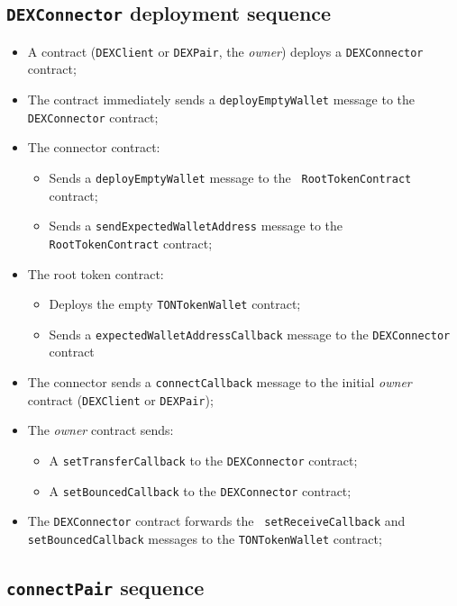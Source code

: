 \subsection{{\tt DEXConnector} deployment sequence}

\begin{itemize}
\item A contract ({\tt DEXClient} or {\tt DEXPair}, the {\em
  owner}) deploys a {\tt DEXConnector} contract;
\item The contract immediately sends a {\tt deployEmptyWallet} message
  to the {\tt DEXConnector} contract;
\item The connector contract:
  \begin{itemize}
  \item Sends a {\tt deployEmptyWallet} message to the {\tt
    RootTokenContract} contract;
  \item Sends a {\tt sendExpectedWalletAddress} message to the {\tt
    RootTokenContract} contract;
  \end{itemize}
\item The root token contract:
  \begin{itemize}
  \item Deploys the empty {\tt TONTokenWallet} contract;
  \item Sends a {\tt expectedWalletAddressCallback} message to the
    {\tt DEXConnector} contract
  \end{itemize}
\item The connector sends a {\tt connectCallback} message to the
  initial {\em owner} contract ({\tt DEXClient} or {\tt DEXPair});
\item The {\em owner} contract sends:
  \begin{itemize}
  \item A {\tt setTransferCallback} to the {\tt DEXConnector} contract;
  \item A {\tt setBouncedCallback} to the {\tt DEXConnector} contract;
  \end{itemize}
\item The {\tt DEXConnector} contract forwards the {\tt
  setReceiveCallback} and {\tt setBouncedCallback} messages to the
  {\tt TONTokenWallet} contract;
\end{itemize}

\subsection{{\tt connectPair} sequence}


